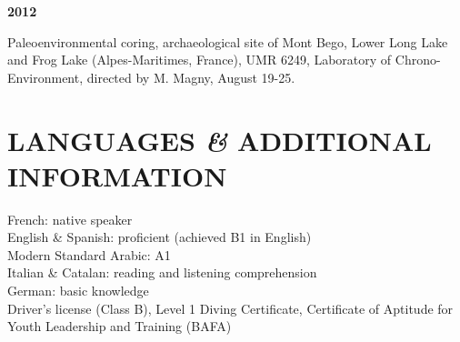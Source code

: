 \documentclass{article}
\newcommand{\fr}[1]{}       %
\newcommand{\en}[1]{#1}     %
\begin{document}
\smallbreak
\textbf{2012}
\fr{Carottage paléoenvironnemental, site archéologique du mont Bego, Lac Long Inférieur et Lac des Grenouilles (Alpes-Maritimes, France), UMR 6249, Laboratoire Chrono-Environnement, dir. M. Magny, 19-25 août.}
\en{Paleoenvironmental coring, archaeological site of Mont Bego, Lower Long Lake and Frog Lake (Alpes-Maritimes, France), UMR 6249, Laboratory of Chrono-Environment, directed by M. Magny, August 19-25.}

\section{\fr{LANGUES \textit{\&} INFORMATIONS COMPLÉMENTAIRES}\en{LANGUAGES \textit{\&} ADDITIONAL INFORMATION}}

\fr{Français : langue maternelle \\
Anglais \& Espagnol : bon niveau (obtenu B1 en Anglais) \\
Arabe standard moderne : A1 \\
Italien \& Catalan : compréhension écrite et orale \\
Allemand : notions \\

Permis de conduire (permis B), Niveau 1 de plongée, Diplôme de Capacité d'Animation (BAFA)}
\en{French: native speaker \\
English \& Spanish: proficient (achieved B1 in English) \\
Modern Standard Arabic: A1 \\
Italian \& Catalan: reading and listening comprehension \\
German: basic knowledge \\

Driver's license (Class B), Level 1 Diving Certificate, Certificate of Aptitude for Youth Leadership and Training (BAFA)}
\end{document}
